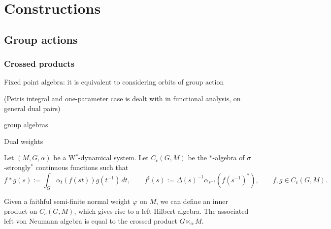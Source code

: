 \documentclass{../../large}
\begin{document}
\part{Constructions}




\chapter{Group actions}



\section{Crossed products}

Fixed point algebra: it is equivalent to considering orbits of group action

(Pettis integral and one-parameter case is dealt with in functional analysis, on general dual pairs)

group algebras

Dual weights
\begin{prb}
Let $(M,G,\alpha)$ be a W$^*$-dynamical system.
Let $C_c(G,M)$ be the $*$-algebra of $\sigma$-strongly$^*$ continuous functions such that
\[f*g(s):=\int_G\alpha_t(f(st))g(t^{-1})\,dt,\qquad f^\sharp(s):=\Delta(s)^{-1}\alpha_{s^{-1}}(f(s^{-1})^*),\qquad f,g\in C_c(G,M).\]



Given a faithful semi-finite normal weight $\varphi$ on $M$, we can define an inner product on $C_c(G,M)$, which gives rise to a left Hilbert algebra.
The associated left von Neumann algebra is equal to the crossed product $G\ltimes_\alpha M$.
\end{prb}
\end{document}
